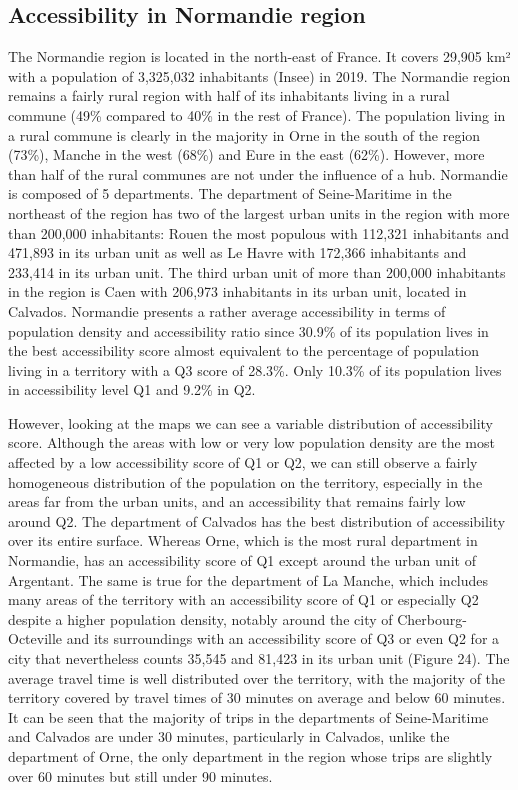 \subsection*{Accessibility in Normandie region}

The Normandie region is located in the north-east of France. It covers 29,905
km² with a population of 3,325,032 inhabitants (Insee) in 2019. The Normandie
region remains a fairly rural region with half of its inhabitants living in a
rural commune (49\% compared to 40\% in the rest of France). The population
living in a rural commune is clearly in the majority in Orne in the south of the
region (73\%), Manche in the west (68\%) and Eure in the east (62\%). However,
more than half of the rural communes are not under the influence of a hub.
Normandie is composed of 5 departments. The department of Seine-Maritime in the
northeast of the region has two of the largest urban units in the region with
more than 200,000 inhabitants: Rouen the most populous with 112,321 inhabitants
and 471,893 in its urban unit as well as Le Havre with 172,366 inhabitants and
233,414 in its urban unit. The third urban unit of more than 200,000 inhabitants
in the region is Caen with 206,973 inhabitants in its urban unit, located in
Calvados. Normandie presents a rather average accessibility in terms of
population density and accessibility ratio since 30.9\% of its population lives
in the best accessibility score almost equivalent to the percentage of
population living in a territory with a Q3 score of 28.3\%. Only 10.3\% of its
population lives in accessibility level Q1 and 9.2\% in Q2.

However, looking at the maps we can see a variable distribution of accessibility
score. Although the areas with low or very low population density are the most
affected by a low accessibility score of Q1 or Q2, we can still observe a fairly
homogeneous distribution of the population on the territory, especially in the
areas far from the urban units, and an accessibility that remains fairly low
around Q2. The department of Calvados has the best distribution of accessibility
over its entire surface. Whereas Orne, which is the most rural department in
Normandie, has an accessibility score of Q1 except around the urban unit of
Argentant. The same is true for the department of La Manche, which includes many
areas of the territory with an accessibility score of Q1 or especially Q2
despite a higher population density, notably around the city of
Cherbourg-Octeville and its surroundings with an accessibility score of Q3 or
even Q2 for a city that nevertheless counts 35,545 and 81,423 in its urban unit
(Figure 24). The average travel time is well distributed over the territory,
with the majority of the territory covered by travel times of 30 minutes on
average and below 60 minutes. It can be seen that the majority of trips in the
departments of Seine-Maritime and Calvados are under 30 minutes, particularly in
Calvados, unlike the department of Orne, the only department in the region whose
trips are slightly over 60 minutes but still under 90 minutes.

